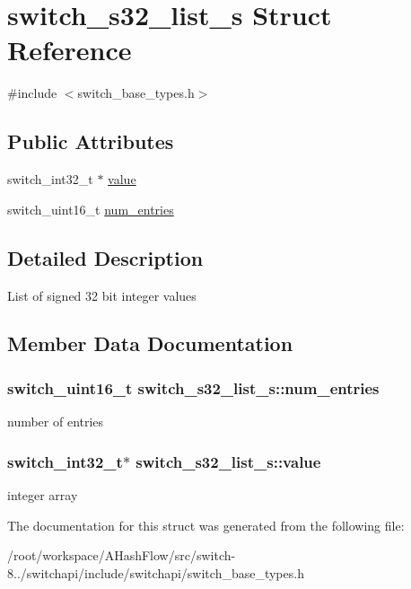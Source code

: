 \hypertarget{structswitch__s32__list__s}{\section{switch\+\_\+s32\+\_\+list\+\_\+s Struct Reference}
\label{structswitch__s32__list__s}
}


{\ttfamily \#include $<$switch\+\_\+base\+\_\+types.\+h$>$}

\subsection*{Public Attributes}
\begin{DoxyCompactItemize}
\item 
switch\+\_\+int32\+\_\+t $\ast$ \hyperlink{structswitch__s32__list__s_ae4bd76a5d1bdfec6d6eb25b534d1a5ec}{value}
\item 
switch\+\_\+uint16\+\_\+t \hyperlink{structswitch__s32__list__s_a246a7265a8c54dc49b174f0705d0181b}{num\+\_\+entries}
\end{DoxyCompactItemize}


\subsection{Detailed Description}
List of signed 32 bit integer values 

\subsection{Member Data Documentation}
\hypertarget{structswitch__s32__list__s_a246a7265a8c54dc49b174f0705d0181b}{
\subsubsection[{num\+\_\+entries}]{\setlength{\rightskip}{0pt plus 5cm}switch\+\_\+uint16\+\_\+t switch\+\_\+s32\+\_\+list\+\_\+s\+::num\+\_\+entries}}\label{structswitch__s32__list__s_a246a7265a8c54dc49b174f0705d0181b}
number of entries \hypertarget{structswitch__s32__list__s_ae4bd76a5d1bdfec6d6eb25b534d1a5ec}{
\subsubsection[{value}]{\setlength{\rightskip}{0pt plus 5cm}switch\+\_\+int32\+\_\+t$\ast$ switch\+\_\+s32\+\_\+list\+\_\+s\+::value}}\label{structswitch__s32__list__s_ae4bd76a5d1bdfec6d6eb25b534d1a5ec}
integer array 

The documentation for this struct was generated from the following file\+:\begin{DoxyCompactItemize}
\item 
/root/workspace/\+A\+Hash\+Flow/src/switch-\/8../switchapi/include/switchapi/switch\+\_\+base\+\_\+types.\+h\end{DoxyCompactItemize}
